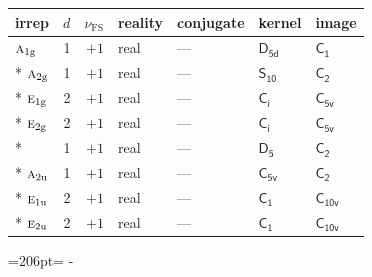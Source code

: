 \documentclass[10pt,a4paper]{article}
\newcommand{\needspace}[1]{\par\penalty-100\begingroup\dimen0=#1\relax\dimen2=\pagegoal
  \advance\dimen2-\pagetotal\ifdim\dimen0>\dimen2\relax\ifdim\dimen2>0pt\vfil\break\fi\fi
  \endgroup}
\numberwithin{equation}{section}
\newcommand{\grp}[1]{\mathsf{#1}}
\newcommand{\irr}[1]{\text{\normalfont\scshape #1}}
\newcommand{\detbox}[1]{{\setlength{\fboxsep}{1pt}\fbox{#1}}}
\newcommand{\ptag}[1]{\mathrm{#1}}
\newcommand{\fsind}{\nu_{\mathrm{FS}}}
\begin{document}
{\small\renewcommand{\arraystretch}{1.25}\begin{longtable}{@{}lrrllll@{}}\toprule
irrep & $d$ & $\fsind$ & reality & conjugate & kernel & image\\\midrule\endhead
\bottomrule\endfoot\endlastfoot
$\irr{a}_{1\ptag{g}}$ & 1 & $+1$ & real & --- & \href{D5d.pdf}{$\grp{D_{5d}}$} & \href{C1.pdf}{$\grp{C_{1}}$}\\*
$\irr{a}_{2\ptag{g}}$ & 1 & $+1$ & real & --- & \href{S10.pdf}{$\grp{S_{10}}$} & \href{C2.pdf}{$\grp{C_{2}}$}\\*
$\irr{e}_{1\ptag{g}}$ & 2 & $+1$ & real & --- & \href{S2.pdf}{$\grp{C_{i}}$} & \href{C5v.pdf}{$\grp{C_{5v}}$}\\*
$\irr{e}_{2\ptag{g}}$ & 2 & $+1$ & real & --- & \href{S2.pdf}{$\grp{C_{i}}$} & \href{C5v.pdf}{$\grp{C_{5v}}$}\\*
\detbox{$\irr{a}_{1\ptag{u}}$} & 1 & $+1$ & real & --- & \href{D5.pdf}{$\grp{D_{5}}$} & \href{C2.pdf}{$\grp{C_{2}}$}\\*
$\irr{a}_{2\ptag{u}}$ & 1 & $+1$ & real & --- & \href{C5v.pdf}{$\grp{C_{5v}}$} & \href{C2.pdf}{$\grp{C_{2}}$}\\*
$\irr{e}_{1\ptag{u}}$ & 2 & $+1$ & real & --- & \href{C1.pdf}{$\grp{C_{1}}$} & \href{C10v.pdf}{$\grp{C_{10v}}$}\\*
$\irr{e}_{2\ptag{u}}$ & 2 & $+1$ & real & --- & \href{C1.pdf}{$\grp{C_{1}}$} & \href{C10v.pdf}{$\grp{C_{10v}}$}\\
\bottomrule\end{longtable}}
\needspace{206pt}
\end{document}
